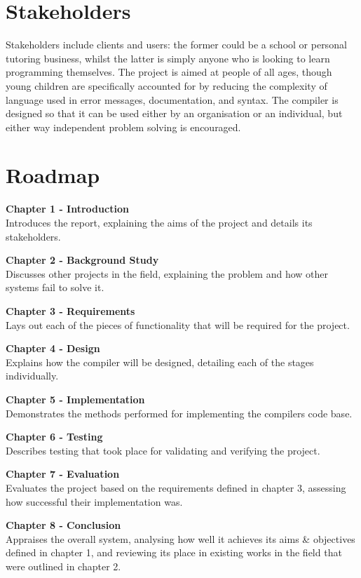 \documentclass[
]{report}
\begin{document}
\section{Stakeholders}
Stakeholders include clients and users: the former could be a school or
personal tutoring business, whilst the latter is simply anyone who is
looking to learn programming themselves. The project is aimed at people
of all ages, though young children are specifically accounted for by
reducing the complexity of language used in error messages,
documentation, and syntax. The compiler is designed so that it can be
used either by an organisation or an individual, but either way
independent problem solving is encouraged.

\section{Roadmap}
\textbf{Chapter 1 - Introduction}\\
Introduces the report, explaining the aims of the project and details
its stakeholders.

\textbf{Chapter 2 - Background Study}\\
Discusses other projects in the field, explaining the problem and how
other systems fail to solve it.

\textbf{Chapter 3 - Requirements}\\
Lays out each of the pieces of functionality that will be required for
the project.

\textbf{Chapter 4 - Design}\\
Explains how the compiler will be designed, detailing each of the stages
individually.

\textbf{Chapter 5 - Implementation}\\
Demonstrates the methods performed for implementing the compilers code
base.

\textbf{Chapter 6 - Testing}\\
Describes testing that took place for validating and verifying the
project.

\textbf{Chapter 7 - Evaluation}\\
Evaluates the project based on the requirements defined in chapter 3,
assessing how successful their implementation was.

\textbf{Chapter 8 - Conclusion}\\
Appraises the overall system, analysing how well it achieves its aims \&
objectives defined in chapter 1, and reviewing its place in existing
works in the field that were outlined in chapter 2.
\end{document}
